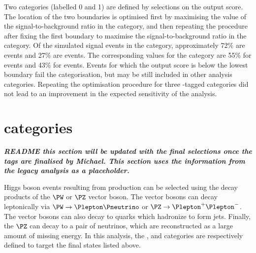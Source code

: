 Two \VBFTag categories (labelled 0 and 1) are defined by selections on the \DiPhoDiJetBdt output score. 
The location of the two boundaries is optimised first by maximising the value of the signal-to-background ratio in the  category, and then repeating the procedure after fixing the first boundary to maximise the signal-to-background ratio in the  category. Of the simulated signal events in the  category, approximately 72\% are \VBF events and 27\% are \ggH events. The corresponding values for the  category are 55\% for \VBF events and 43\% for \ggH events. Events for which the \DiPhoDiJetBdt output score is below the lowest boundary fail the \VBFTag categorisation, but may be still included in other analysis categories. Repeating the optimisation procedure for three \VBF-tagged categories did not lead to an improvement in the expected sensitivity of the analysis.

\section{\VHTag categories}
\label{cat:sec:vhtag}

\emph{\textbf{README this section will be updated with the final selections once the tags are finalised by Michael. This section uses the information from the legacy analysis as a placeholder.}}

Higgs boson events resulting from \VH production can be selected using the decay products of the $\PW$ or $\PZ$ vector boson. The vector bosons can decay leptonically via $\PW \rightarrow \Plepton \Pneutrino$ or $\PZ \rightarrow \Plepton^{+} \Plepton^{-}$. The vector bosons can also decay to quarks which hadronize to form jets. Finally, the $\PZ$ can decay to a pair of neutrinos, which are reconstructed as a large amount of missing energy. In this analysis, the \VHLeptonicTag, \VHHadronicTag and \VHMETTag categories are respectively defined to target the final states listed above. %

